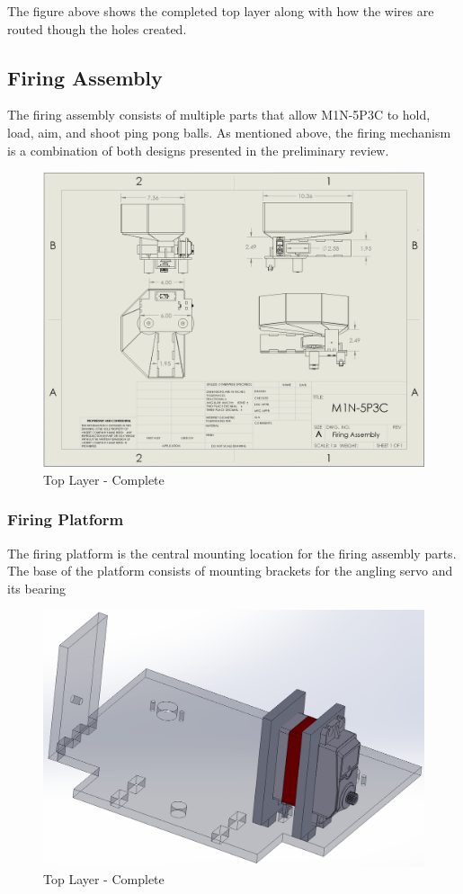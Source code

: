\documentclass{article}
\begin{document}
The figure above shows the completed top layer along with how the wires are routed though the holes created. 

\subsection{Firing Assembly}
The firing assembly consists of multiple parts that allow M1N-5P3C to hold, load, aim, and shoot ping pong balls. As mentioned above, the firing mechanism is a combination of both designs presented in the preliminary review.

\begin{figure}[H]
    \centering
    \includegraphics[width = 5in]{FiringAssemblyDrawing.PNG}
    \caption{Top Layer - Complete}
    \label{fig:FiringAssemblyDrawing}
\end{figure}

\subsubsection{Firing Platform}
The firing platform is the central mounting location for the firing assembly parts. The base of the platform consists of mounting brackets for the angling servo and its bearing 

\begin{figure}[H]
    \centering
    \includegraphics[width = 5in]{FiringPlatformCAD.PNG}
    \caption{Top Layer - Complete}
    \label{fig:FiringPlatformCAD}
\end{figure}
\end{document}
